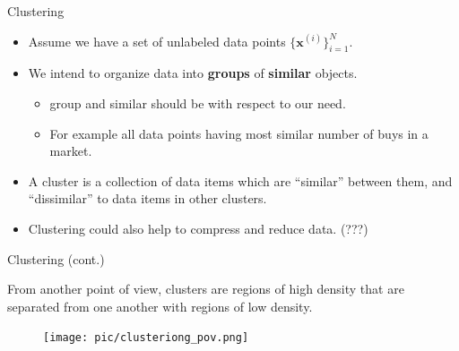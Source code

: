 \documentclass[serif, aspectratio=169]{beamer}
\begin{document}
\begin{frame}{Clustering}
    \begin{minipage}{0.95\textwidth}
        \begin{itemize}
        \item Assume we have a set of unlabeled data points $ \{ \mathbf{x}^{(i)} \}_{i=1}^N$.
        \item We intend to organize data into \textbf{groups }of \textbf{similar }objects.
        \begin{itemize}
            \item group and similar should be with respect to our need.
            \item For example all data points having most similar number of buys in a market.
        \end{itemize}
        \item A cluster is a collection of data items which are “similar” between them, and “dissimilar” to data items in other clusters.
        \item Clustering could also help to compress and reduce data. (???)
    \end{itemize}
    \end{minipage}%
\end{frame}

\begin{frame}{Clustering (cont.)}
    \begin{minipage}{0.55\textwidth}
        From another point of view, clusters are regions of high density that are separated from one another with regions of low density.
    \end{minipage}%
    \begin{minipage}{0.4\textwidth}
        \begin{figure}
            \centering
            \texttt{[image: pic/clusteriong\_pov.png]}
        \end{figure}
    \end{minipage}
\end{frame}
\end{document}

